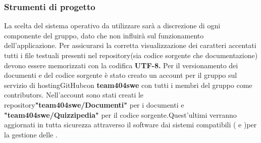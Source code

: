 \documentclass[a4paper,11pt]{article}
\begin{document}
		\subsubsection{Strumenti di progetto} \label{s:strum} 	
	
		La scelta del sistema operativo da utilizzare sarà a discrezione di ogni componente del gruppo, dato che non influirà sul funzionamento dell'applicazione.
		Per assicurarsi la corretta visualizzazione dei caratteri accentati tutti i file testuali presenti nel repository\addglos(sia codice sorgente che documentazione) devono essere memorizzati con la codifica\textbf{ UTF-8\addglos.}
		Per il versionamento dei documenti e del codice sorgente è stato creato un account per il gruppo sul servizio di hosting\addglos GitHub\addglos con  \textbf{team404swe\addglos} con tutti i membri del gruppo come contributors\addglos . Nell'account sono stati creati le repository\addglos \textbf{"team404swe/Documenti"} per i documenti e \textbf{"team404swe/Quizzipedia"\addglos} per il codice sorgente.Quest'ultimi verranno aggiornati in tutta sicurezza attraverso  il software \textbf{} dai sistemi compatibili ( e )per la gestione delle  . 
				
\end{document}
